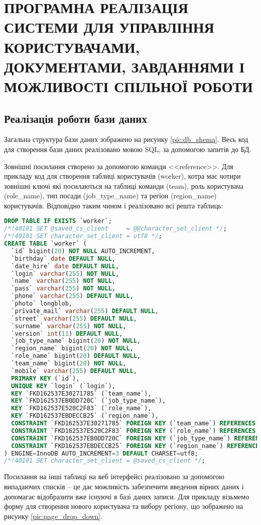 \section{ПРОГРАМНА РЕАЛІЗАЦІЯ СИСТЕМИ ДЛЯ УПРАВЛІННЯ КОРИСТУВАЧАМИ, ДОКУМЕНТАМИ, ЗАВДАННЯМИ І МОЖЛИВОСТІ СПІЛЬНОЇ РОБОТИ}
\subsection{Реалізація роботи бази даних}
\par Загальна структура бази даних зображено на рисунку \ref{pic:db_shema}. Весь код для створення бази даних реалізовано мовою SQL, за допомогою запитів до БД.
\par Зовнішні посилання створено за допомогою команди <<reference>>. Для прикладу код для створення таблиці користувачів (worker), котра має чотири зовнішні ключі які посилаються на таблиці команди (team), роль користувача (role\_name), тип посади (job\_type\_name) та регіон (region\_name) користувачів. Відповідно таким чином і реалізовано всі решта таблиць:

\begin{lstlisting}[language=SQL]
DROP TABLE IF EXISTS `worker`;
/*!40101 SET @saved_cs_client     = @@character_set_client */;
/*!40101 SET character_set_client = utf8 */;
CREATE TABLE `worker` (
  `id` bigint(20) NOT NULL AUTO_INCREMENT,
  `birthday` date DEFAULT NULL,
  `date_hire` date DEFAULT NULL,
  `login` varchar(255) NOT NULL,
  `name` varchar(255) NOT NULL,
  `pass` varchar(255) NOT NULL,
  `phone` varchar(255) DEFAULT NULL,
  `photo` longblob,
  `private_mail` varchar(255) DEFAULT NULL,
  `street` varchar(255) DEFAULT NULL,
  `surname` varchar(255) NOT NULL,
  `version` int(11) DEFAULT NULL,
  `job_type_name` bigint(20) NOT NULL,
  `region_name` bigint(20) NOT NULL,
  `role_name` bigint(20) DEFAULT NULL,
  `team_name` bigint(20) NOT NULL,
  `mobile` varchar(255) DEFAULT NULL,
  PRIMARY KEY (`id`),
  UNIQUE KEY `login` (`login`),
  KEY `FKD162537E30271785` (`team_name`),
  KEY `FKD162537EB0DD720C` (`job_type_name`),
  KEY `FKD162537E520C2F83` (`role_name`),
  KEY `FKD162537EBDECCB25` (`region_name`),
  CONSTRAINT `FKD162537E30271785` FOREIGN KEY (`team_name`) REFERENCES `team` (`id`),
  CONSTRAINT `FKD162537E520C2F83` FOREIGN KEY (`role_name`) REFERENCES `worker_role` (`id`),
  CONSTRAINT `FKD162537EB0DD720C` FOREIGN KEY (`job_type_name`) REFERENCES `worker_job_type` (`id`),
  CONSTRAINT `FKD162537EBDECCB25` FOREIGN KEY (`region_name`) REFERENCES `region` (`id`)
) ENGINE=InnoDB AUTO_INCREMENT=3 DEFAULT CHARSET=utf8;
/*!40101 SET character_set_client = @saved_cs_client */;	
\end{lstlisting}
\par Посилання на інші таблиці на веб інтерфейсі реалізовано за допомогою випадаючих списків -- це дає можливість забезпечити введення вірних даних і допомагає відобразити вже існуючі в базі даних записи.
Для прикладу візьмемо форму для створення нового користувача та вибору регіону, що зображено на рисунку \ref{pic:page_drop_down}.


